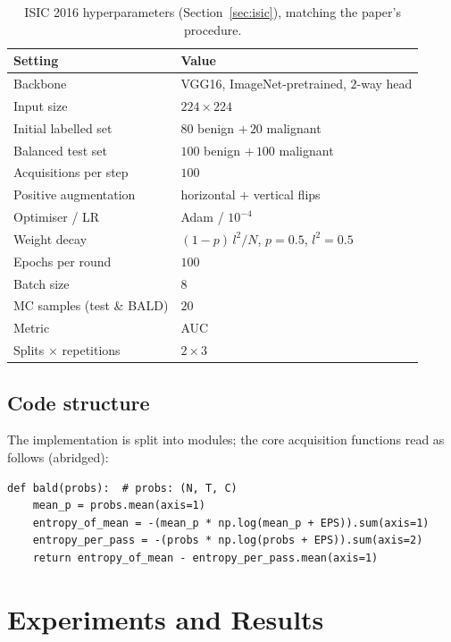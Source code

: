 \documentclass[11pt]{article}
\begin{document}
\begin{table}[h]
  \centering
  \caption{ISIC 2016 hyperparameters (Section~\ref{sec:isic}), matching the
           paper's procedure.}
  \label{tab:hparams-isic}
  \begin{tabular}{ll}
    \toprule
    Setting & Value\\
    \midrule
    Backbone                     & VGG16, ImageNet-pretrained, $2$-way head\\
    Input size                   & $224\times224$\\
    Initial labelled set         & $80$ benign $+\,20$ malignant\\
    Balanced test set            & $100$ benign $+\,100$ malignant\\
    Acquisitions per step        & $100$\\
    Positive augmentation        & horizontal $+$ vertical flips\\
    Optimiser / LR               & Adam / $10^{-4}$\\
    Weight decay                 & $(1-p)\,l^2/N$, $p{=}0.5$, $l^2{=}0.5$\\
    Epochs per round             & $100$\\
    Batch size                   & $8$\\
    MC samples (test \& BALD)    & $20$\\
    Metric                       & AUC\\
    Splits $\times$ repetitions  & $2 \times 3$\\
    \bottomrule
  \end{tabular}
\end{table}

\subsection{Code structure}
The implementation is split into modules; the core acquisition functions read as
follows (abridged):
\begin{lstlisting}
def bald(probs):  # probs: (N, T, C)
    mean_p = probs.mean(axis=1)
    entropy_of_mean = -(mean_p * np.log(mean_p + EPS)).sum(axis=1)
    entropy_per_pass = -(probs * np.log(probs + EPS)).sum(axis=2)
    return entropy_of_mean - entropy_per_pass.mean(axis=1)
\end{lstlisting}

\section{Experiments and Results}
\label{sec:results}
\end{document}
